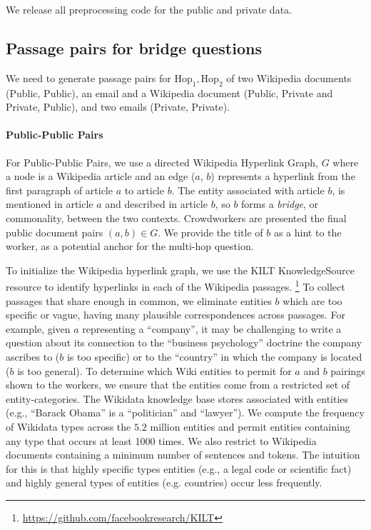 \documentclass{article}
\renewcommand\cite{\citep}	\newcommand\shortcite{\citeyearpar}\newcommand\newcite{\citet}
\begin{document}
We release all preprocessing code for the public and private data.


\subsection{Passage pairs for bridge questions} We need to generate passage pairs for $\mathrm{Hop_1}, \mathrm{Hop_2}$ of two Wikipedia documents (Public, Public), an email and a Wikipedia document (Public, Private and Private, Public), and two emails (Private, Private).


\paragraph{Public-Public Pairs} For Public-Public Pairs, we use a directed Wikipedia Hyperlink Graph, $G$ where a node is a Wikipedia article and an edge ($a$, $b$) represents a hyperlink from the first paragraph of article $a$ to  article $b$. The entity associated with article $b$, is mentioned in article $a$ and described in article $b$, so $b$ forms a \textit{bridge}, or commonality, between the two contexts. 
Crowdworkers are presented the final public document pairs $(a, b) \in G$. We provide the title of $b$ as a hint to the worker, as a potential anchor for the multi-hop question.

To initialize the Wikipedia hyperlink graph, we use the KILT KnowledgeSource resource \cite{petroni-etal-2021-kilt} to identify hyperlinks in each of the Wikipedia passages. \footnote{\url{https://github.com/facebookresearch/KILT}} To collect passages that share enough in common, we eliminate entities $b$ which are too specific or vague, having many plausible correspondences across passages. For example, given $a$ representing a ``company'', it may be challenging to write a question about its connection to the ``business psychology'' doctrine the company ascribes to ($b$ is too specific) or to the ``country'' in which the company is located ($b$ is too general). To determine which Wiki entities to permit for $a$ and $b$ pairings shown to the workers, we ensure that the entities come from a restricted set of entity-categories. The Wikidata knowledge base stores  associated with entities (e.g., ``Barack Obama'' is a ``politician'' and ``lawyer''). We compute the frequency of Wikidata types across the $5.2$ million entities and permit entities containing any type that occurs at least 1000 times.
We also restrict to Wikipedia documents containing a minimum number of sentences and tokens. The intuition for this is that highly specific types entities (e.g., a legal code or scientific fact) and highly general types of entities (e.g. countries) occur less frequently. 
\end{document}
